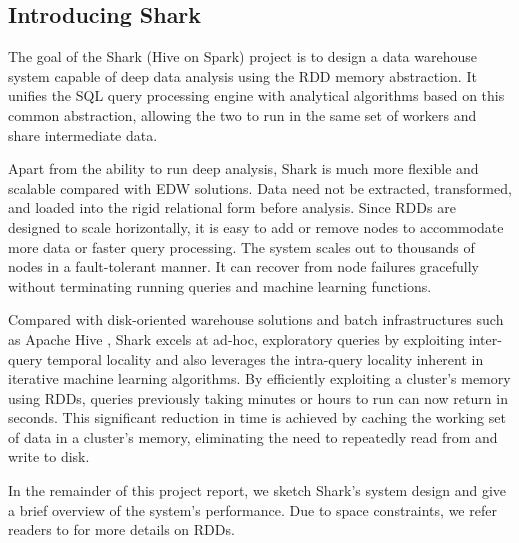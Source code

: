 \subsection{Introducing Shark}
The goal of the Shark (Hive on Spark) project is to design a data warehouse system capable of deep data analysis using the RDD memory abstraction. It unifies the SQL query processing engine with analytical algorithms based on this common abstraction, allowing the two to run in the same set of workers and share intermediate data.

Apart from the ability to run deep analysis, Shark is much more flexible and scalable compared with EDW solutions. Data need not be extracted, transformed, and loaded into the rigid relational form before analysis. Since RDDs are designed to scale horizontally, it is easy to add or remove nodes to accommodate more data or faster query processing. The system scales out to thousands of nodes in a fault-tolerant manner. It can recover from node failures gracefully without terminating running queries and machine learning functions.

Compared with disk-oriented warehouse solutions and batch infrastructures such as Apache Hive \cite{hive}, Shark excels at ad-hoc, exploratory queries by exploiting inter-query temporal locality and also leverages the intra-query locality inherent in iterative machine learning algorithms. By efficiently exploiting a cluster's memory using RDDs, queries previously taking minutes or hours to run can now return in seconds. This significant reduction in time is achieved by caching the working set of data in a cluster's memory, eliminating the need to repeatedly read from and write to disk.

In the remainder of this project report, we sketch Shark's system design and give a brief overview of the system's performance. Due to space constraints, we refer readers to \cite{spark-tr} for more details on RDDs.
